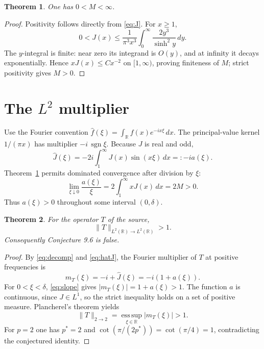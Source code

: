 \documentclass[11pt]{article}
\newtheorem{theorem}{Theorem}
\newcommand{\R}{\mathbb R}
\begin{document}
\begin{theorem}\label{thm:moment}
One has $0<M<\infty$.
\end{theorem}

\begin{proof}
Positivity follows directly from \eqref{eq:J}.  For $x\ge1$,
\[
 0<J(x)
 \le \frac{1}{\pi^3x^3}
       \int_0^\infty\frac{2y^3}{\sinh^2y}\,dy.
\]
The $y$-integral is finite: near zero its integrand is $O(y)$, and at
infinity it decays exponentially.  Hence $xJ(x)\le Cx^{-2}$ on
$[1,\infty)$, proving finiteness of $M$; strict positivity gives
$M>0$.
\end{proof}

\section{\texorpdfstring{The $L^2$ multiplier}{The L2 multiplier}}

Use the Fourier convention
$\widehat f(\xi)=\int_\R f(x)e^{-ix\xi}\,dx$.  The principal-value
kernel $1/(\pi x)$ has multiplier $-i\,\operatorname{sgn}\xi$.
Because $J$ is real and odd,
\begin{equation}\label{eq:hatJ}
 \widehat J(\xi)
 =-2i\int_1^\infty J(x)\sin(x\xi)\,dx
 =:-i a(\xi).
\end{equation}
Theorem~\ref{thm:moment} permits dominated convergence after division
by $\xi$:
\begin{equation}\label{eq:slope}
 \lim_{\xi\downarrow0}\frac{a(\xi)}{\xi}
 =2\int_1^\infty xJ(x)\,dx=2M>0.
\end{equation}
Thus $a(\xi)>0$ throughout some interval $(0,\delta)$.

\begin{theorem}\label{thm:counterexample}
For the operator $T$ of the source,
\[
 \lVert T\rVert_{L^2(\R)\to L^2(\R)}>1.
\]
Consequently Conjecture 9.6 is false.
\end{theorem}

\begin{proof}
By \eqref{eq:decomp} and \eqref{eq:hatJ}, the Fourier multiplier of
$T$ at positive frequencies is
\[
 m_T(\xi)=-i+\widehat J(\xi)=-i(1+a(\xi)).
\]
For $0<\xi<\delta$, \eqref{eq:slope} gives
$|m_T(\xi)|=1+a(\xi)>1$.  The function $a$ is continuous, since
$J\in L^1$, so the strict inequality holds on a set of positive
measure.  Plancherel's theorem yields
\[
 \lVert T\rVert_{2\to2}
 =\operatorname*{ess\,sup}_{\xi\in\R}|m_T(\xi)|>1.
\]
For $p=2$ one has $p^*=2$ and
$\cot(\pi/(2p^*))=\cot(\pi/4)=1$, contradicting the conjectured
identity.
\end{proof}
\end{document}
